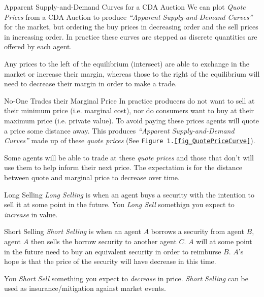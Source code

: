 \documentclass[11pt,a4paper]{article}
\begin{document}
  \begin{proposition}{Apparent Supply-and-Demand Curves for a CDA Auction}
    We can plot \textit{Quote Prices} from a CDA Auction to produce \textit{``Apparent Supply-and-Demand Curves''} for the market, but ordering the buy prices in decreasing order and the sell prices in increasing order. In practice these curves are stepped as discrete quantities are offered by each agent.
    \par Any prices to the left of the equilibrium (intersect) are able to exchange in the market or increase their margin, whereas those to the right of the equilibrium will need to decrease their margin in order to make a trade.
  \end{proposition}

  \begin{remark}{No-One Trades their Marginal Price}
    In practice producers do not want to sell at their minimum price (i.e. marginal cost), nor do consumers want to buy at their maximum price (i.e. private value). To avoid paying these prices agents will quote a price some distance away. This produces \textit{``Apparent Supply-and-Demand Curves''} made up of these \textit{quote prices} (See \texttt{Figure 1.\ref{fig_QuotePriceCurve}}).
    \par Some agents will be able to trade at these \textit{quote prices} and those that don't will use them to help inform their next price. The expectation is for the distance between quote and marginal price to decrease over time.
  \end{remark}

  \begin{definition}{Long Selling}
    \textit{Long Selling} is when an agent buys a security with the intention to sell it at some point in the future. You \textit{Long Sell} somethign you expect to \textit{increase} in value.
  \end{definition}

  \begin{definition}{Short Selling}
    \textit{Short Selling} is when an agent $A$ borrows a security from agent $B$, agent $A$ then sells the borrow security to another agent $C$. $A$ will at some point in the future need to buy an equivalent security in order to reimburse $B$. $A$'s hope is that the price of the security will have decrease in this time.
    \par You \textit{Short Sell} something you expect to \textit{decrease} in price. \textit{Short Selling} can be used as insurance/mitigation against market events.
  \end{definition}
\end{document}
